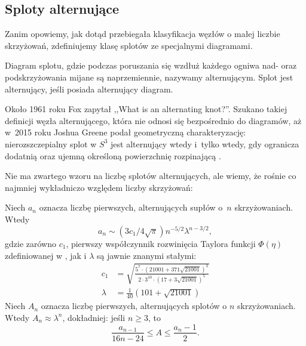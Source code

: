 
\subsection{Sploty alternujące}

Zanim opowiemy, jak dotąd przebiegała klasyfikacja węzłów o małej liczbie skrzyżowań, zdefiniujemy klasę splotów ze specjalnymi diagramami.

\begin{definition}[alternacja]
%
    Diagram splotu, gdzie podczas poruszania się wzdłuż każdego ogniwa nad- oraz podskrzyżowania mijane są naprzemiennie, nazywamy alternującym.
    Splot jest alternujący, jeśli posiada alternujący diagram.
\end{definition}

Około 1961 roku Fox zapytał ,,What is an alternating knot?''.
%
Szukano takiej definicji węzła alternującego, która nie odnosi się bezpośrednio do diagramów, aż w~2015 roku Joshua Greene podał geometryczną charakteryzację: nierozszczepialny splot w $S^3$ jest alternujący wtedy i~tylko wtedy, gdy ogranicza dodatnią oraz ujemną określoną powierzchnię rozpinającą \cite{greene2017}.
%

Nie ma zwartego wzoru na liczbę splotów alternujących, ale wiemy, że rośnie co najmniej wykładniczo względem liczby skrzyżowań:

\begin{proposition}
%
    Niech $a_n$ oznacza liczbę pierwszych, alternujących supłów o~$n$ skrzyżowaniach.
    Wtedy
    \begin{equation}
        a_n \sim (3c_1/4\sqrt{\pi})n^{-5/2}\lambda^{n-3/2},
    \end{equation}
    gdzie zarówno $c_1$, pierwszy współczynnik rozwinięcia Taylora funkcji $\Phi(\eta)$ zdefiniowanej w \cite{sundberg1998}, jak i $\lambda$ są jawnie znanymi stałymi:
    \begin{align}
        c_1 & = \sqrt{\frac{5^7 \cdot (21001 + 371 \sqrt{21001})^3}{2 \cdot 3^{10} \cdot (17 + 3\sqrt{21001})^5}} \\
        \lambda & = \frac {1}{40} (101 + \sqrt{21001})
    \end{align}
    Niech $A_n$ oznacza liczbę pierwszych, alternujących splotów o $n$ skrzyżowaniach.
    Wtedy $A_n \approx \lambda^n$, dokładniej: jeśli $n \ge 3$, to
    \begin{equation}
        \frac{a_{n-1}}{16n - 24} \le A \le \frac{a_n - 1}{2}.
    \end{equation}
\end{proposition}

